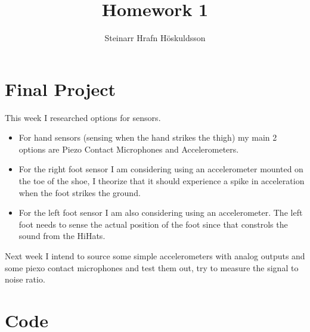 \documentclass{article}
\title{Homework 1}
\author{Steinarr Hrafn Höskuldsson}
\newcommand{\mycomment}[1]{}
\begin{document}
\mycomment{

\begin{figure}[h]
    \centering
    \texttt{[image: LAB3/Basic1.png]}
    \caption{"Switch test" Breadboard set up}
    \label{fig:Switch_test}
\end{figure}



} %

\pagestyle{firststyle}
{\let\newpage\relax\maketitle}

\section*{Final Project}

This week I researched options for sensors.
\begin{itemize}
    \item  For hand sensors (sensing when the hand strikes the thigh) my main 2 options are Piezo Contact Microphones and Accelerometers.

\item For the right foot sensor I am considering using an accelerometer mounted on the toe of the shoe, I theorize that it should experience a spike in acceleration when the foot strikes the ground.

\item For the left foot sensor I am also considering using an accelerometer. The left foot needs to sense the actual position of the foot since that constrols the sound from the HiHats. 

\end{itemize}
Next week I intend to source some simple accelerometers with analog outputs and some piexo contact microphones and test them out, try to measure the signal to noise ratio.

\newpage
\appendix
\section{Code}\label{appendix:code}


\end{document}
